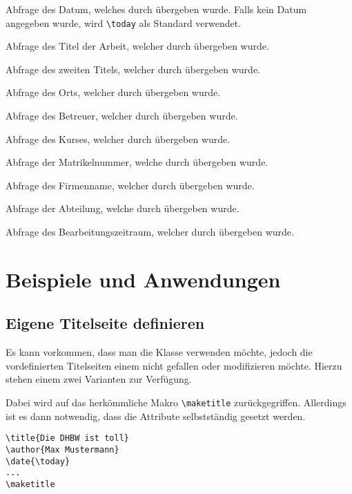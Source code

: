 \documentclass[babel=ngerman,highlight=false]{skdoc}
\begin{document}
            \DescribeMacro\getDate Abfrage des Datum, welches durch  übergeben wurde. Falls kein Datum angegeben wurde, wird \verb|\today| als Standard verwendet.
            
            \DescribeMacro\getThesisTitle Abfrage des Titel der Arbeit, welcher durch  übergeben wurde.
            
            \DescribeMacro\getThesisSecondTitle Abfrage des zweiten Titels, welcher durch  übergeben wurde.
            
            \DescribeMacro\getLocation Abfrage des Orts, welcher durch  übergeben wurde.
            
            \DescribeMacro\getSupervisor Abfrage des Betreuer, welcher durch  übergeben wurde.
            
            \DescribeMacro\getCourse Abfrage des Kurses, welcher durch  übergeben wurde.
            
            \DescribeMacro\getStudentId Abfrage der Matrikelnummer, welche durch  übergeben wurde.
            
            \DescribeMacro\getInstitute Abfrage des Firmenname, welcher durch  übergeben wurde.
            
            \DescribeMacro\getInstituteSection Abfrage der Abteilung, welche durch  übergeben wurde.
            
            \DescribeMacro\getProcessingPeriod Abfrage des Bearbeitungszeitraum, welcher durch  übergeben wurde.
            
    \section{Beispiele und Anwendungen}
        \subsection{Eigene Titelseite definieren}
            Es kann vorkommen, dass man die Klasse verwenden möchte, jedoch die vordefinierten Titelseiten einem nicht gefallen oder modifizieren möchte. Hierzu stehen einem zwei Varianten zur Verfügung.
            
            Dabei wird auf das herkömmliche Makro \verb|\maketitle| zurückgegriffen. Allerdings ist es dann notwendig, dass die Attribute selbstständig gesetzt werden.
            \begin{verbatim}
\title{Die DHBW ist toll}
\author{Max Mustermann}
\date{\today}
...
\maketitle
            \end{verbatim}
            
\end{document}
